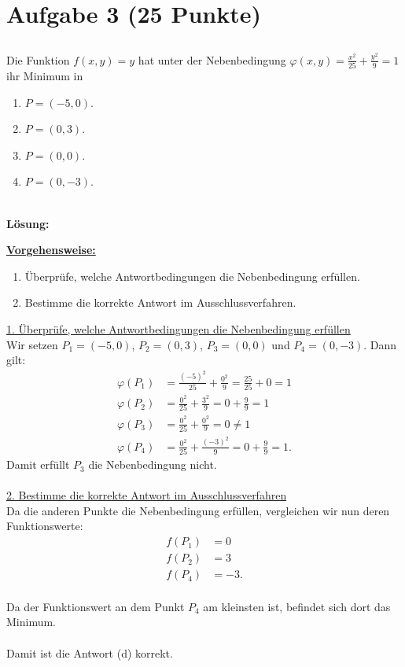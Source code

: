 \section*{Aufgabe 3 (25 Punkte)}
\vspace{0.4cm}
\subsection*{}
Die Funktion $ f(x,y) = y  $ hat unter der Nebenbedingung $ \varphi(x,y) = \frac{x^2}{25} + \frac{y^2}{9} = 1 $
ihr Minimum in
\renewcommand{\labelenumi}{(\alph{enumi})}
\begin{enumerate}
	\item $ P = (-5,0) $.
	\item $ P = (0,3) $.
	\item $ P = (0,0) $.
	\item $ P = (0,-3) $.
\end{enumerate}
\ \\
\textbf{Lösung:}
\begin{mdframed}
\underline{\textbf{Vorgehensweise:}}
\renewcommand{\labelenumi}{\theenumi.}
\begin{enumerate}
\item Überprüfe, welche Antwortbedingungen die Nebenbedingung erfüllen.
\item Bestimme die korrekte Antwort im Ausschlussverfahren.
\end{enumerate}
\end{mdframed}

\underline{1. Überprüfe, welche Antwortbedingungen die Nebenbedingung erfüllen}\\
Wir setzen $ P_1 = (-5,0) $, $ P_2 = (0,3)  $, $ P_3=(0,0) $ und $ P_4 = (0,-3) $.
Dann gilt:
\begin{align*}
\varphi(P_1)
&=
\frac{(-5)^2}{25} + \frac{0^2}{9} = \frac{25}{25} + 0 = 1\\
\varphi(P_2)
&=
\frac{0^2}{25} + \frac{3^2}{9} = 0 + \frac{9}{9} = 1\\
\varphi(P_3)
&=
\frac{0^2}{25} + \frac{0^2}{9} = 0 \neq 1\\
\varphi(P_4)
&=
\frac{0^2}{25} + \frac{(-3)^2}{9} = 0 + \frac{9}{9} = 1.
\end{align*}
Damit erfüllt $ P_3 $ die Nebenbedingung nicht.\\
\\
\underline{2. Bestimme die korrekte Antwort im Ausschlussverfahren}\\
Da die anderen Punkte die Nebenbedingung erfüllen, vergleichen wir nun deren Funktionswerte:
\begin{align*}
f(P_1) &= 0\\
f(P_2) &= 3\\
f(P_4) &= -3.
\end{align*}
\ \\
Da der Funktionswert an dem Punkt $ P_4 $ am kleinsten ist, befindet sich dort das Minimum.\\
\\
Damit ist die Antwort (d) korrekt.

